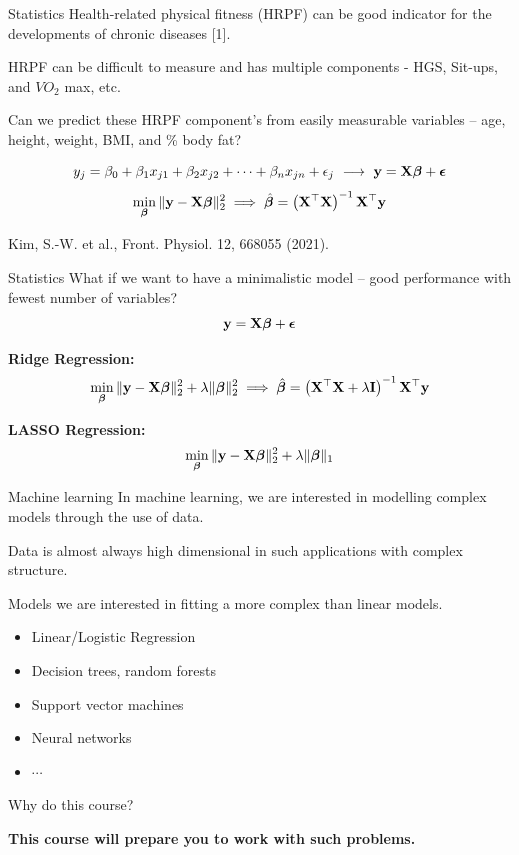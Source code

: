 \documentclass[aspectratio=169]{beamer}
\let\olditem\item
\renewcommand{\item}{\setlength{\itemsep}{\fill}\olditem}
\def\mf{\ensuremath\mathbf}
\def\lp{\ensuremath\left(}
\def\rp{\ensuremath\right)}
\begin{document}
\begin{frame}{Statistics}
  Health-related physical fitness (HRPF) can be good indicator for the developments of chronic diseases [1].

  HRPF can be difficult to measure and has multiple components - HGS, Sit-ups, and $VO_2$ max, etc.
  
  Can we predict these HRPF component's from easily measurable variables -- age, height, weight, BMI, and \% body fat?

  \[ y_j = \beta_0 + \beta_1 x_{j1} + \beta_2 x_{j2} + \cdots + \beta_n x_{jn} + \epsilon_j \,\, \longrightarrow \,\, \mf{y} = \mf{X}\bm{\beta} + \bm{\epsilon} \]
  \[ \min_{\bm{\beta}} \Vert \mf{y} - \mf{X}\bm{\beta}\Vert_2^2 \implies \hat{\bm{\beta}} = \lp \mf{X}^\top{\mf{X}} \rp^{-1}\mf{X}^\top\mf{y} \]

  \vspace{0.75cm}

  \begin{small}
    [1] Kim, S.-W. et al., Front. Physiol. 12, 668055 (2021).
  \end{small}
\end{frame}


\begin{frame}{Statistics}
  What if we want to have a minimalistic model --  good performance with fewest number of variables?
  \[ \mf{y} = \mf{X}\bm{\beta} + \bm{\epsilon} \]

  \textbf{Ridge Regression:}
  \[ \min_{\bm{\beta}} \Vert \mf{y} - \mf{X}\bm{\beta}\Vert_2^2 + \lambda \Vert \bm{\beta} \Vert_2^2 \implies \hat{\bm{\beta}} = \lp \mf{X}^\top{\mf{X}} + \lambda \mf{I} \rp^{-1}\mf{X}^\top\mf{y} \]

  \vspace{0.7cm}

  \textbf{LASSO Regression:}
  \[ \min_{\bm{\beta}} \Vert \mf{y} - \mf{X}\bm{\beta}\Vert_2^2 + \lambda \Vert \bm{\beta} \Vert_1 \]
\end{frame}


\begin{frame}{Machine learning}
  In machine learning, we are interested in modelling complex models through the use of data.
  \vspace{0.5cm}
  
  Data is almost always high dimensional in such applications with complex structure.
  \vspace{0.5cm}
  
  Models we are interested in fitting a more complex than linear models.
  \begin{itemize}
    \item Linear/Logistic Regression
    \item Decision trees, random forests
    \item Support vector machines
    \item Neural networks
    \item $\cdots$
  \end{itemize}
\end{frame}


\begin{frame}{Why do this course?}
  \begin{center}
    \textcolor{myred}{\huge \textbf{This course will prepare you to work with such problems.}}
  \end{center}
\end{frame}
\end{document}
